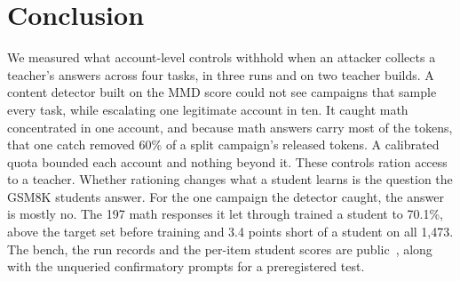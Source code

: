 \documentclass[journal]{IEEEtran}
\begin{document}
\section{Conclusion}
We measured what account-level controls withhold when an attacker collects a teacher's answers across four tasks, in three runs and on two teacher builds. A content detector built on the MMD score could not see campaigns that sample every task, while escalating one legitimate account in ten. It caught math concentrated in one account, and because math answers carry most of the tokens, that one catch removed 60\% of a split campaign's released tokens. A calibrated quota bounded each account and nothing beyond it. These controls ration access to a teacher. Whether rationing changes what a student learns is the question the GSM8K students answer. For the one campaign the detector caught, the answer is mostly no. The 197 math responses it let through trained a student to 70.1\%, above the target set before training and 3.4 points short of a student on all 1,473. The bench, the run records and the per-item student scores are public~\cite{trace2026artifact}, along with the unqueried confirmatory prompts for a preregistered test.



\end{document}
